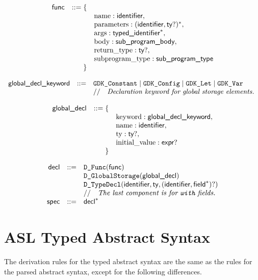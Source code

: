 \documentclass{book}
\begin{document}
\[
\begin{array}{rrl}
\textsf{func} &::= \{& \\
 & & \text{name} : \textsf{identifier}, \\
 & & \text{parameters} : (\textsf{identifier}, \textsf{ty}?)^*,\\
 & & \text{args} : \textsf{typed\_identifier}^*,\\
 & & \text{body} : \textsf{sub\_program\_body},\\
 & & \text{return\_type} : \textsf{ty}?,\\
 & & \text{subprogram\_type} : \textsf{sub\_program\_type}\\
 & \} &
\end{array}
\]

\[
\begin{array}{rcl}
\textsf{global\_decl\_keyword} &::=& \texttt{GDK\_Constant} \;|\; \texttt{GDK\_Config} \;|\; \texttt{GDK\_Let} \;|\; \texttt{GDK\_Var}\\
  & & //\quad\textit{Declaration keyword for global storage elements.}\ \\
\end{array}
\]

\[
\begin{array}{rrl}
\textsf{global\_decl} &::= \{& \\
 & & \text{keyword} : \textsf{global\_decl\_keyword}, \\
 & & \text{name} : \textsf{identifier},\\
 & & \text{ty} : \textsf{ty}?,\\
 & & \text{initial\_value} : \textsf{expr}?\\
 & \} &
\end{array}
\]

\[
\begin{array}{rcl}
\textsf{decl} &::=& \texttt{D\_Func}(\textsf{func})\\
  & & \texttt{D\_GlobalStorage}(\textsf{global\_decl})\\
  & & \texttt{D\_TypeDecl}(\textsf{identifier}, \textsf{ty}, (\textsf{identifier}, \textsf{field}^*)?)\\
  & & //\quad\textit{The last component is for \texttt{with} fields.}\ \\
\textsf{spec} &::=& \textsf{decl}^*\\
\end{array}
\]

\section{ASL Typed Abstract Syntax}

The derivation rules for the typed abstract syntax are the same as the rules for the parsed abstract syntax,
except for the following differences.
\end{document}
